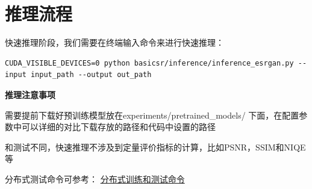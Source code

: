\documentclass[../main.tex]{subfiles}
\begin{document}

\section{推理流程}

快速推理阶段，我们需要在终端输入命令来进行快速推理：
\begin{verbatim}
CUDA_VISIBLE_DEVICES=0 python basicsr/inference/inference_esrgan.py --input input_path --output out_path
\end{verbatim}

\begin{hl} %

    \textbf{推理注意事项}

    需要提前下载好预训练模型放在experiments/pretrained\_models/ 下面，在配置参数中可以详细的对比下载存放的路径和代码中设置的路径

    和测试不同，快速推理不涉及到定量评价指标的计算，比如PSNR，SSIM和NIQE等

    分布式测试命令可参考：
    \href{https://github.com/XPixelGroup/BasicSR/blob/master/docs/TrainTest.md}{分布式训练和测试命令}

\end{hl}
\end{document}
